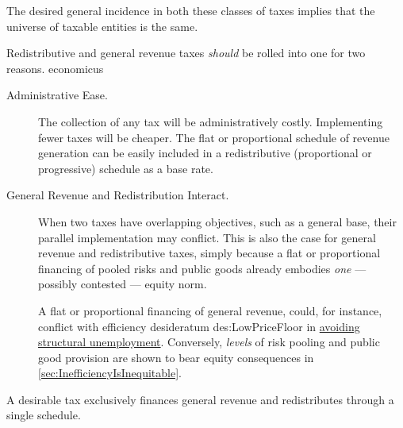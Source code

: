 The desired general incidence in both these classes of taxes implies that the universe of taxable entities is the same.

Redistributive and general revenue taxes \emph{should} be rolled into one for two reasons.
economicus
\begin{description}
	\item[Administrative Ease.] The collection of any tax will be administratively costly.
Implementing fewer taxes will be cheaper.
The flat or proportional schedule of revenue generation can be easily included in a redistributive (proportional or progressive) schedule as a base rate.
	\item[General Revenue and Redistribution Interact.] When two taxes have overlapping objectives, such as a general base, their parallel implementation may conflict.
This is also the case for general revenue and redistributive taxes, simply because a flat or proportional financing of pooled risks and public goods already embodies \emph{one} --- possibly contested --- equity norm.

	A flat or proportional financing of general revenue, could, for instance, conflict with efficiency desideratum	{des:LowPriceFloor} in \hyperref[des:LowPriceFloor]{avoiding structural unemployment}.
Conversely, \emph{levels} of risk pooling and public good provision are shown to bear equity consequences in \autoref{sec:InefficiencyIsInequitable}.
\end{description}

\begin{desideratum}
	A desirable tax exclusively finances general revenue and redistributes through a single schedule.
	\label{des:redistribution-n-revenue-are-one}
\end{desideratum}

